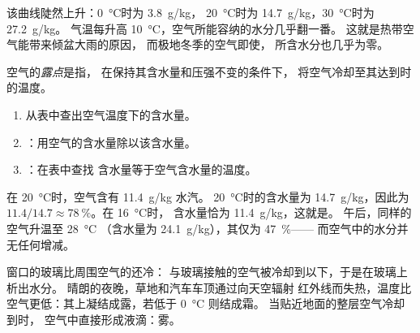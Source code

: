 该曲线陡然上升：\qty{0}{\degreeCelsius}时为 \qty{3.8}{g/kg}，
\qty{20}{\degreeCelsius}时为 \qty{14.7}{g/kg}，\qty{30}{\degreeCelsius}时为 \qty{27.2}{g/kg}。
气温每升高 \qty{10}{\degreeCelsius}，空气所能容纳的水分几乎翻一番。
这就是热带空气能带来倾盆大雨的原因，
而极地冬季的空气即使，
所含水分也几乎为零。

\begin{definition}[露点]\label{def:g10:why-clouds-form:dew-point}
空气的\emph{露点}是指，
在保持其含水量和压强不变的条件下，
将空气冷却至其达到时的温度。
\end{definition}

\begin{method}[由表格求相对湿度与露点]\label{met:g10:why-clouds-form:table}
\begin{enumerate}
  \item 从表中查出空气温度下的含水量。
  \item {}：用空气的含水量除以该含水量。
  \item {}：在表中查找
        含水量等于空气含水量的温度。
\end{enumerate}
\end{method}

\begin{example}[夏日清晨]\label{ex:g10:why-clouds-form:morning}
在 \qty{20}{\degreeCelsius}时，空气含有 \qty{11.4}{g/kg} 水汽。
\qty{20}{\degreeCelsius}时的含水量为 \qty{14.7}{g/kg}，因此为
$11.4/14.7 \approx \qty{78}{\percent}$。在 \qty{16}{\degreeCelsius}时，
含水量恰为 \qty{11.4}{g/kg}，这就是。
午后，同样的空气升温至 \qty{28}{\degreeCelsius}
（含水量为 \qty{24.1}{g/kg}），其仅为 \qty{47}{\percent}——
而空气中的水分并无任何增减。
\end{example}

窗口的玻璃比周围空气的还冷：
与玻璃接触的空气被冷却到以下，于是在玻璃上析出水分。
晴朗的夜晚，草地和汽车车顶通过向天空辐射
红外线而失热，温度比空气更低：其上凝结成露，若低于 \qty{0}{\degreeCelsius} 则结成霜。
当贴近地面的整层空气冷却到时，
空气中直接形成液滴：雾。

